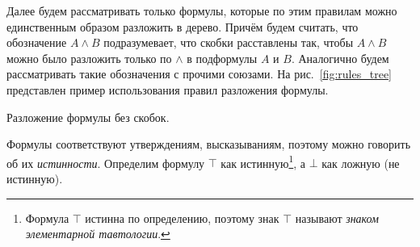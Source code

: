 Далее будем рассматривать только формулы, которые по этим правилам можно
единственным образом разложить в дерево. Причём будем считать, что
обозначение $A\land B$ подразумевает, что скобки расставлены так,
чтобы $A\land B$ можно
было разложить только по $\land$ в подформулы $A$ и $B$. Аналогично будем рассматривать
такие обозначения с прочими союзами.
На рис.~\ref{fig:rules_tree} представлен пример использования правил
разложения формулы.

\begin{marginfigure}[-5cm]
  \centering

  \caption{Разложение формулы без скобок.}\label{fig:rules_tree}
\end{marginfigure}

Формулы соответствуют утверждениям, высказываниям,
поэтому можно говорить об их {\it истинности}.
Определим формулу $\top$ как истинную\footnote{Формула $\top$ истинна по определению,
поэтому знак $\top$ называют {\it знаком элементарной тавтологии}.
},
а $\bot$ как ложную (не истинную).

